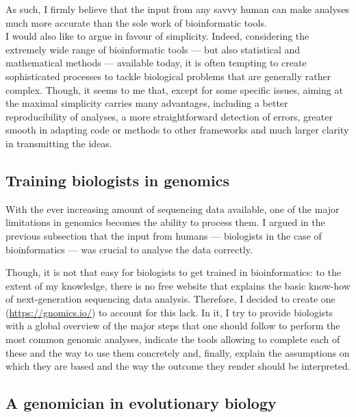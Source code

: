 As such, I firmly believe that the input from any savvy human can make analyses much more accurate than the sole work of bioinformatic tools.\\

I would also like to argue in favour of simplicity.
Indeed, considering the extremely wide range of bioinformatic tools — but also statistical and mathematical methods — available today, it is often tempting to create sophisticated processes to tackle biological problems that are generally rather complex.
Though, it seems to me that, except for some specific issues, aiming at the maximal simplicity carries many advantages, including a better reproducibility of analyses, a more straightforward detection of errors, greater smooth in adapting code or methods to other frameworks and much larger clarity in transmitting the ideas.





\subsection{Training biologists in genomics}

With the ever increasing amount of sequencing data available, one of the major limitations in genomics becomes the ability to process them.
I argued in the previous subsection that the input from humans — biologists in the case of bioinformatics — was crucial to analyse the data correctly.

Though, it is not that easy for biologists to get trained in bioinformatics: to the extent of my knowledge, there is no free website that explains the basic know-how of next-generation sequencing data analysis.
Therefore, I decided to create one (\url{https://gnomics.io/}) to account for this lack.
In it, I try to provide biologists with a global overview of the major steps that one should follow to perform the most common genomic analyses, indicate the tools allowing to complete each of these and the way to use them concretely and, finally, explain the assumptions on which they are based and the way the outcome they render should be interpreted.




\subsection{A genomician in evolutionary biology}

